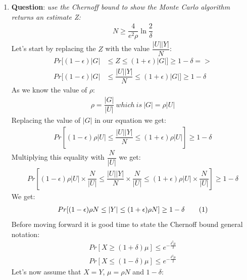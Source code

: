 \documentclass[11pt,a4paper,english]{article}
\newcommand\numberthis{\addtocounter{equation}{1}\tag{\theequation}}
\begin{document}
\begin{enumerate}
\begin{enumerate}
          \item \textbf{Question}: \textit{use the Chernoff bound to show the Monte Carlo algorithm returns an estimate Z:}
            \begin{align*}
              N \geq \dfrac{4}{e^{2} \rho}\ln \dfrac{2}{\delta}
            \end{align*}
            Let's start by replacing the $Z$ with the value $\dfrac{|U||Y|}{N}$:
            \begin{align*}
              Pr[(1 - \epsilon)|G| & \leq Z \leq (1 + \epsilon)|G|] \geq 1 - \delta => \\
              Pr[(1 - \epsilon)|G| & \leq \dfrac{|U||Y|}{N} \leq (1 + \epsilon)|G|] \geq 1 - \delta
            \end{align*}
            As we know the value of $\rho$:
            \begin{align*}
              \rho = \dfrac{|G|}{|U|} \ which \ is \ |G| = \rho|U|
            \end{align*}
            Replacing the value of $|G|$ in our equation we get:
            \begin{align*}
              Pr[(1 - \epsilon)\rho|U| \leq \dfrac{|U||Y|}{N} \leq (1 + \epsilon)\rho|U|] \geq 1 - \delta
            \end{align*}
            Multiplying this equality with $\dfrac{N}{|U|}$ we get:
            \begin{align*}
              Pr[(1 - \epsilon)\rho|U| \times \dfrac{N}{|U|} \leq \dfrac{|U||Y|}{N} \times \dfrac{N}{|U|} \leq (1 + \epsilon)\rho|U| \times \dfrac{N}{|U|}] \geq 1 - \delta
            \end{align*}
            We get:
            \begin{align*}
              Pr[(1 - \epsilon)\rho N \leq |Y| \leq (1 + \epsilon)\rho N] \geq 1 - \delta \numberthis \label{eqn}
            \end{align*}
            Before moving forward it is good time to state the Chernoff bound general notation:
            \begin{align*}
              Pr[X \geq (1 + \delta) \mu] \leq e^{ -\frac{ \delta^2 \mu }{3} } \\
              Pr[X \leq (1 - \delta) \mu] \leq e^{ -\frac{ \delta^2 \mu }{2} }
            \end{align*}
            Let's now assume that $X=Y$, $\mu = \rho N$ and $1-\delta$:
            \begin{align*}

\end{align*}
\end{enumerate}
\end{enumerate}
\end{document}
